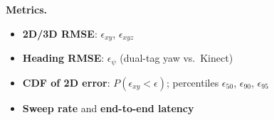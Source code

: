 \textbf{Metrics.}
\begin{itemize}
  \item \textbf{2D/3D RMSE}: $\epsilon_{xy}$, $\epsilon_{xyz}$
  \item \textbf{Heading RMSE}: $\epsilon_\psi$ (dual-tag yaw vs.\ Kinect)
  \item \textbf{CDF of 2D error}: $P(\epsilon_{xy} < \epsilon)$;
    percentiles $\epsilon_{50}$, $\epsilon_{90}$, $\epsilon_{95}$
  \item \textbf{Sweep rate} and \textbf{end-to-end latency}
\end{itemize}
